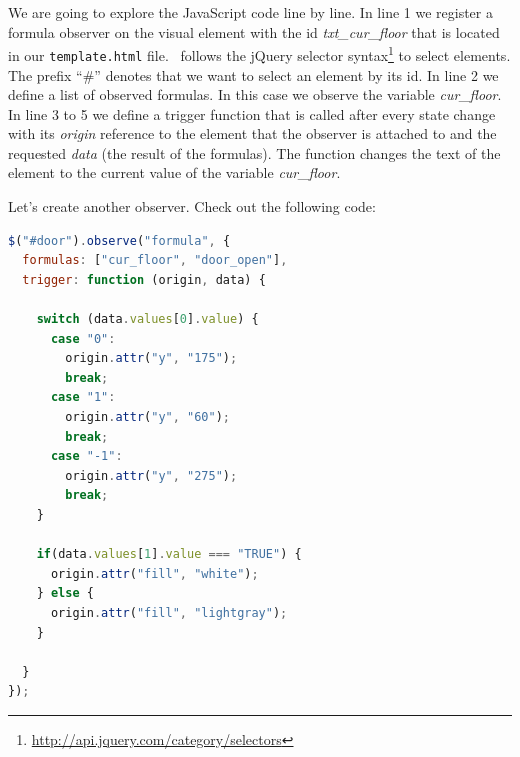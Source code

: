 We are going to explore the JavaScript code line by line.
In line 1 we register a formula observer on the visual element with the id \textit{txt\_cur\_floor} that is located in our \texttt{template.html} file.
\bms~follows the jQuery selector syntax\footnote{\url{http://api.jquery.com/category/selectors}} to select elements.
The prefix ``\#'' denotes that we want to select an element by its id.
In line 2 we define a list of observed formulas.
In this case we observe the variable \textit{cur\_floor}.
In line 3 to 5 we define a trigger function that is called after every state change with its \textit{origin} reference to the element that the observer is attached to and the requested \textit{data} (the result of the formulas).
The function changes the text of the element to the current value of the variable \textit{cur\_floor}.

Let's create another observer.
Check out the following code:

\begin{lstlisting}[float=ht,language=JavaScript, caption={Formula Observer for the Lift Door (JavaScript)}]
$("#door").observe("formula", {
  formulas: ["cur_floor", "door_open"],
  trigger: function (origin, data) {
    
    switch (data.values[0].value) {
      case "0":
        origin.attr("y", "175");
        break;
      case "1":
        origin.attr("y", "60");
        break;
      case "-1":
        origin.attr("y", "275");
        break;
    }
    
    if(data.values[1].value === "TRUE") {
      origin.attr("fill", "white");
    } else {
      origin.attr("fill", "lightgray");
    }
    
  }
});
\end{lstlisting}

